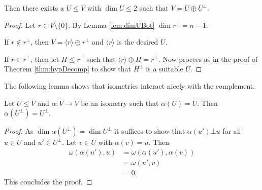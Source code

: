 

\begin{lemma}\label{lem:decompositionComplement}
Then there exists a $U\leq V$ with $\dim U\leq 2$ such that $V=U\oplus U^\bot$.
\end{lemma}
\begin{proof}
Let $r\in V\setminus\{0\}$. By Lemma \ref{lem:dimUBot} $\dim r^\bot= n-1$. %

If $r\notin r^\bot$, then $V=\langle r\rangle\oplus r^\bot$ and $\langle r\rangle$ is the desired $U$.

If $r\in r^\bot$, then let $H\leq r^\bot$ such that $\langle r\rangle\oplus H=r^\bot$. Now procces as in the proof of Theorem  \ref{thm:hypDecomp} to show that $H^\bot$ is a suitable $U$.


\end{proof}

The following lemma shows that isometries interact nicely with the complement.

\begin{lemma}\label{lem:isomStaysInCompl}
Let $U\leq V$ and $\alpha\colon V\to V$ be an isometry such that $\alpha(U)=U$. Then $\alpha(U^\bot)= U^\bot$.
\end{lemma}
\begin{proof}
As $\dim \alpha(U^\bot)=\dim U^\bot$ it suffices to show that $\alpha(u')\bot u$ for all $u\in U$ and $u'\in U^\bot$. Let $v\in U$ with $\alpha(v)=u$. Then
\begin{align*}
\omega(\alpha(u'),u)&=\omega(\alpha(u'),\alpha(v))\\
&=\omega(u',v)\\
&=0.
\end{align*}
This concludes the proof.
\end{proof}

